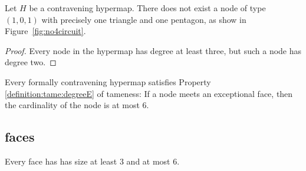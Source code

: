 \begin{lemma}\label{lemma:nobad4}
Let $H$ be a contravening hypermap.
There does not exist a node of 
type $(1,0,1)$ with precisely one triangle and
one pentagon, as show in Figure~\ref{fig:no4circuit}. 
\end{lemma}

\begin{proof}  Every node in
the hypermap has degree at least three, but such a node
has degree two.
\end{proof}

\begin{lemma} \label{lemma:deg5}
Every formally contravening hypermap satisfies Property
\ref{definition:tame:degreeE} of tameness: If a node meets an
exceptional face, then the cardinality of the node is at most $6$.
\end{lemma}

\subsection{faces}

\begin{lemma}  Every face has has size at least $3$ and at most $6$.
\end{lemma}

